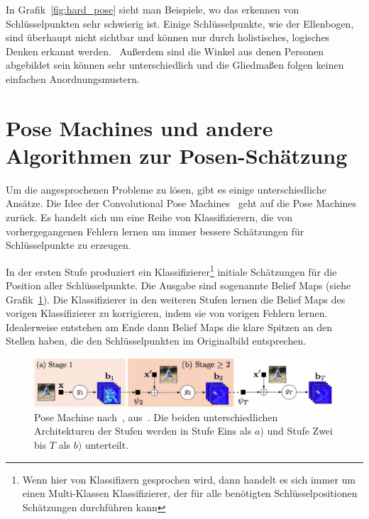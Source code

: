 \documentclass[journal, a4paper]{IEEEtran}
\begin{document}
        In Grafik~\ref{fig:hard_pose} sieht man Beispiele, wo das erkennen von Schlüsselpunkten sehr schwierig ist. Einige Schlüsselpunkte, wie der Ellenbogen, sind überhaupt nicht sichtbar und können nur durch holistisches, logisches Denken erkannt werden.~\cite{toshev2014deeppose} Außerdem sind die Winkel aus denen Personen abgebildet sein können sehr unterschiedlich und die Gliedmaßen folgen keinen einfachen Anordnungsmustern.


\section{Pose Machines und andere Algorithmen zur Posen-Schätzung}
        Um die angesprochenen Probleme zu lösen, gibt es einige unterschiedliche Ansätze. %
        Die Idee der Convolutional Pose Machines~\cite{conv_pose} geht auf die Pose Machines~\cite{ramakrishna2014pose} zurück. Es handelt sich um eine Reihe von Klassifizierern, die von vorhergegangenen Fehlern lernen um immer bessere Schätzungen für Schlüsselpunkte zu erzeugen. 

        In der ersten Stufe produziert ein Klassifizierer\footnote{Wenn hier von Klassifizern gesprochen wird, dann handelt es sich immer um einen Multi-Klassen Klassifizierer, der für alle benötigten Schlüsselpositionen Schätzungen durchführen kann} initiale Schätzungen für die Position aller Schlüsselpunkte. Die Ausgabe sind sogenannte Belief Maps (siehe Grafik~\ref{fig:pose_machine}). Die Klassifizierer in den weiteren Stufen lernen die Belief Maps des vorigen Klassifizierer zu korrigieren, indem sie von vorigen Fehlern lernen. Idealerweise entstehen am Ende dann Belief Maps die klare Spitzen an den Stellen haben, die den Schlüsselpunkten im Originalbild entsprechen.

        \begin{figure}[!hbt]
                \begin{center}
                \includegraphics[width=1\columnwidth]{pose_machine.png}
                \caption{Pose Machine nach~\cite{ramakrishna2014pose}, aus~\cite{conv_pose}. Die beiden unterschiedlichen Architekturen der Stufen werden in Stufe Eins als $a)$ und Stufe Zwei bis $T$ als $b)$ unterteilt.}
                \label{fig:pose_machine}
                
                \end{center}
        \end{figure}
\end{document}
